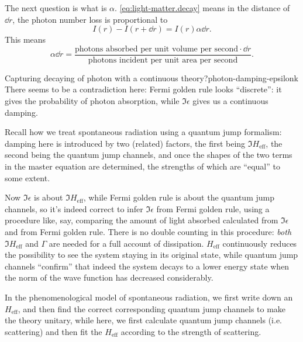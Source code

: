 \documentclass[hyperref, a4paper, 12pt]{report}
\begin{document}
The next question is what is $\alpha$. 
\eqref{eq:light-matter.decay} means in the distance of $\dd{r}$, 
the photon number loss is proportional to
\[
    I(r) - I(r + \dd{r}) = I(r) \alpha \dd{r}.
\] 
This means 
\begin{equation}
    \alpha \dd{r} = \frac{
        \text{photons absorbed per unit volume per second} \cdot \dd{r}
    }{
        \text{photons incident per unit area per second}
    }.
\end{equation}

\begin{theorybox}{Capturing decaying of photon with a continuous theory?}{photon-damping-epsilonk}
    There seems to be a contradiction here:
    Fermi golden rule looks ``discrete'': 
    it gives the probability of photon absorption,
    while $\Im \epsilon$ gives us a continuous damping.
    
    Recall how we treat spontaneous radiation using a quantum jump formalism:
    damping here is introduced by two (related) factors,
    the first being $\Im H_{\text{eff}}$, the second being the quantum jump channels,
    and once the shapes of the two terms in the master equation are determined,
    the strengths of which are ``equal'' to some extent.
    
    Now $\Im \epsilon$ is about $\Im H_{\text{eff}}$,
    while Fermi golden rule is about the quantum jump channels,
    so it's indeed correct to infer $\Im \epsilon$ from Fermi golden rule,
    using a procedure like, say, 
    comparing the amount of light absorbed calculated from $\Im \epsilon$ 
    and from Fermi golden rule.
    There is no double counting in this procedure:
    \emph{both} $\Im H_{\text{eff}}$ and $\Gamma$ are needed for a full account of dissipation.
    $H_{\text{eff}}$ continuously reduces the possibility 
    to see the system staying in its original state,
    while quantum jump channels ``confirm'' that 
    indeed the system decays to a lower energy state
    when the norm of the wave function has decreased considerably.
    
    In the phenomenological model of spontaneous radiation,
    we first write down an $H_{\text{eff}}$,
    and then find the correct corresponding quantum jump channels
    to make the theory unitary,
    while here, 
    we first calculate quantum jump channels (i.e. scattering)
    and then fit the $H_{\text{eff}}$ according to the strength of scattering.
\end{theorybox}
\end{document}
